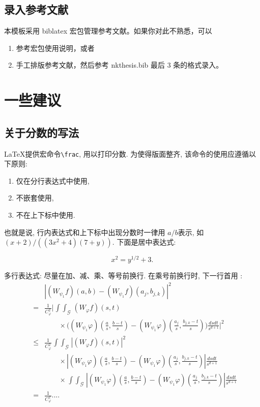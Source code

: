 \documentclass[12pt,openright]{book}
\begin{document}
\subsection{录入参考文献}

本模板采用 biblatex 宏包管理参考文献。如果你对此不熟悉，可以
\begin{enumerate}
\item 参考宏包使用说明，或者
\item 手工排版参考文献，然后参考 nkthesis.bib 最后 3 条的格式录入。
\end{enumerate}



\section{一些建议}
\subsection{关于分数的写法}
\label{sec:relatedwork:equation}


\LaTeX 提供宏命令\verb+\frac+, 用以打印分数. 为使得版面整齐, 该命令的使用应遵循以下原则:

\begin{enumerate}
\item 仅在分行表达式中使用,
\item 不嵌套使用,
\item 不在上下标中使用.
\end{enumerate}

也就是说, 行内表达式和上下标中出现分数时一律用 $a/b$表示, 如
$(x+2)/((3x^2+4)(7+y))$. 下面是居中表达式:

\[
 x^2 = y^{1/2} +3.
\]

多行表达式: 尽量在加、减、乘、等号前换行. 在乘号前换行时,
下一行首用 \string\times:
\def\iint{\mathop{\int\!\!\!\int}}\def\calG{\mathcal G}
\begin{eqnarray}
&&\left|(W_{\psi_1}f)(a,b)-(W_{\psi_1}f)(a_j,b_{j,k})\right|^{2}\nonumber\\
&=&\frac{1}{C^{2}_{\varphi}}\Bigg|\iint_{\calG} (W_{\varphi}f)(s,t) \nonumber\\
&&\qquad\times \Bigg( (W_{\psi_1}\varphi)\left(\frac{a}{s},
\frac{b-t}{s}\right)
     -(W_{\psi_1}\varphi)\left(\frac{a_{j}}{s}, \frac{b_{j,k}-t}{s}\right)\Bigg)
  \frac{dsdt}{s^{d+1}}\Bigg|^2 \nonumber\\
&\le& \frac{1}{C^2_{\varphi}} \iint_{\calG} |(W_{\varphi}f)(s,t)|^2 \nonumber\\
&&\qquad \times\left| (W_{\psi_1}\varphi)\left(\frac{a}{s},
\frac{b-t}{s}\right)
    -(W_{\psi_1}\varphi)\left(\frac{a_{j}}{s}, \frac{b_{j,k}-t}{s}\right)\right|
   \frac{dsdt}{s^{d+1}}  \nonumber\\
&&\qquad \times   \iint_{\calG}\!
 \left|(W_{\psi_1}\varphi)\left(\frac{a}{s}, \frac{b-t}{s}\right)
    -(W_{\psi_1}\varphi)\left(\frac{a_{j}}{s}, \frac{b_{j,k}-t}{s}\right)\right|
 \frac{ ds dt}{s^{d+1}} \nonumber\\
&=& \frac{1}{C^2_{\varphi}} ....  \label{eq:a0}
\end{eqnarray}
\end{document}
